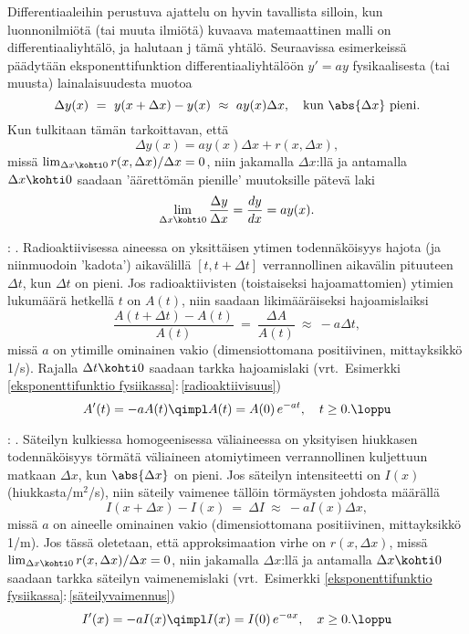 Differentiaaleihin perustuva ajattelu on hyvin tavallista silloin, kun luonnonilmiötä 
(tai muuta ilmiötä) kuvaava matemaattinen malli on differentiaaliyhtälö, ja halutaan 
j tämä yhtälö. Seuraavissa esimerkeissä päädytään eksponenttifunktion
differentiaaliyhtälöön $y'=ay$ fysikaalisesta (tai muusta) lainalaisuudesta muotoa
\[ 
\Delta y(x)\ =\ y(x+\Delta x)-y(x)\ \approx\ ay(x)\Delta x, \quad 
                                       \text{kun}\ \abs{\Delta x}\ \text{pieni}. 
\]
Kun tulkitaan tämän tarkoittavan, että
\[ 
\Delta y(x) = ay(x)\Delta x + r(x,\Delta x), 
\]
missä $\lim_{\Delta x \kohti 0} r(x,\Delta x)/\Delta x = 0$, niin jakamalla $\Delta x$:llä ja 
antamalla $\Delta x \kohti 0$ saadaan 'äärettömän pienille' muutoksille pätevä laki
\[ 
\lim_{\Delta x \kohti 0} \frac{\Delta y}{\Delta x} = \frac{dy}{dx} = ay(x). 
\]
%
\begin{Exa}: . Radioaktiivisessa aineessa on yksittäisen
ytimen todennäköisyys hajota (ja niinmuodoin 'kadota') aikavälillä $[t,t+\Delta t]$
verrannollinen aikavälin pituuteen $\Delta t$, kun $\Delta t$ on pieni. Jos radioaktiivisten
(toistaiseksi hajoamattomien) ytimien lukumäärä hetkellä $t$ on $A(t)$, niin saadaan
likimääräiseksi hajoamislaiksi
\[
\frac{A(t+\Delta t)-A(t)}{A(t)}\ =\ \frac{\Delta A}{A(t)}\ \approx\ -a\Delta t,
\]
missä $a$ on ytimille ominainen vakio (dimensiottomana positiivinen, mittayksikkö 1/s). Rajalla
$\Delta t\kohti 0$ saadaan tarkka hajoamislaki
(vrt.\ Esimerkki \ref{eksponenttifunktio fysiikassa}:\,\ref{radioaktiivisuus})
\[
A'(t)=-aA(t) \qimpl A(t) = A(0)\,e^{-at}, \quad t \ge 0. \loppu
\]
\end{Exa}
%
\begin{Exa}: . Säteilyn kulkiessa homogeenisessa väliaineessa on
yksityisen hiukkasen todennäköisyys törmätä väliaineen atomiytimeen verrannollinen kuljettuun
matkaan $\Delta x$, kun $\abs{\Delta x}$ on pieni. Jos säteilyn intensiteetti on $I(x)$
(hiukkasta/m$^2$/s), niin säteily vaimenee tällöin törmäysten johdosta määrällä
\[
I(x+\Delta x)-I(x)\ =\ \Delta I\ \approx\ -aI(x)\Delta x,
\]
missä $a$ on aineelle ominainen vakio (dimensiottomana positiivinen, mittayksikkö 1/m). Jos 
tässä oletetaan, että approksimaation virhe on $r(x,\Delta x)$, missä 
$\lim_{\Delta x \kohti 0} r(x,\Delta x)/\Delta x = 0$, niin jakamalla $\Delta x$:llä ja 
antamalla $\Delta x \kohti 0$ saadaan tarkka säteilyn vaimenemislaki
(vrt.\ Esimerkki \ref{eksponenttifunktio fysiikassa}:\,\ref{säteilyvaimennus})
\[
I'(x)=-aI(x) \qimpl I(x) = I(0)\,e^{-ax}, \quad x \ge 0. \loppu 
\]
\end{Exa}
